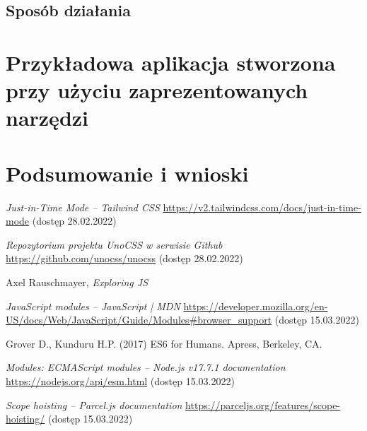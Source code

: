 \documentclass{SGGW-thesis}
\begin{document}
\section{Sposób działania}


\chapter{Przykładowa aplikacja stworzona przy użyciu zaprezentowanych narzędzi}

\chapter{Podsumowanie i wnioski}


\begin{thebibliography}{9}
\textit{Just-in-Time Mode -- Tailwind CSS}
\url{https://v2.tailwindcss.com/docs/just-in-time-mode} (dostęp 28.02.2022)

\textit{Repozytorium projektu UnoCSS w serwisie Github}
\url{https://github.com/unocss/unocss} (dostęp 28.02.2022)

Axel Rauschmayer, \textit{Exploring JS}

\textit{JavaScript modules -- JavaScript | MDN}
\url{https://developer.mozilla.org/en-US/docs/Web/JavaScript/Guide/Modules#browser_support} (dostęp 15.03.2022)

Grover D., Kunduru H.P. (2017) ES6 for Humans. Apress, Berkeley, CA.

\textit{Modules: ECMAScript modules -- Node.js v17.7.1 documentation}
\url{https://nodejs.org/api/esm.html} (dostęp 15.03.2022)

\textit{Scope hoisting -- Parcel.js documentation}
\url{https://parceljs.org/features/scope-hoisting/} (dostęp 15.03.2022)

\end{thebibliography}

\beforelastpage
\end{document}

